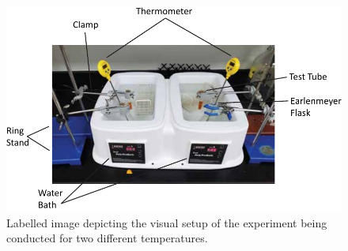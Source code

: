 \begin{figure}[!htb]
    \centering
    \includegraphics[width=1.0\textwidth]{fig/images/visual_setup.pdf}
    \caption{Labelled image depicting the visual setup of the experiment being conducted for two different temperatures.}
    \label{fig:visual_setup}
\end{figure}
